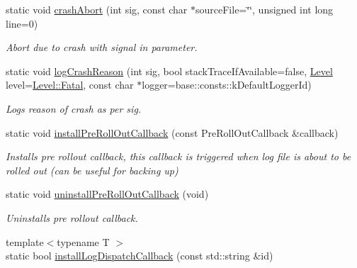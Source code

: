 \begin{DoxyCompactItemize}
static void \hyperlink{classel_1_1_helpers_a6e16f0e07ce40e0659fcfec4ea5b6fe1}{crash\+Abort} (int sig, const char $\ast$source\+File=\char`\"{}\char`\"{}, unsigned int long line=0)
\begin{DoxyCompactList}\small\item\em Abort due to crash with signal in parameter. \end{DoxyCompactList}\item 
static void \hyperlink{classel_1_1_helpers_abf1ae61428740e1e6c5d5f0c36500faa}{log\+Crash\+Reason} (int sig, bool stack\+Trace\+If\+Available=false, \hyperlink{namespaceel_ab0ac6091262344c52dd2d3ad099e8e36}{Level} level=\hyperlink{namespaceel_ab0ac6091262344c52dd2d3ad099e8e36a882384ec38ce8d9582b57e70861730e4}{Level\+::\+Fatal}, const char $\ast$logger=base\+::consts\+::k\+Default\+Logger\+Id)
\begin{DoxyCompactList}\small\item\em Logs reason of crash as per sig. \end{DoxyCompactList}\item 
\mbox{\label{classel_1_1_helpers_a5fd7ad6d636c28d2e706203d0c43cf8c}} 
static void \hyperlink{classel_1_1_helpers_a5fd7ad6d636c28d2e706203d0c43cf8c}{install\+Pre\+Roll\+Out\+Callback} (const Pre\+Roll\+Out\+Callback \&callback)
\begin{DoxyCompactList}\small\item\em Installs pre rollout callback, this callback is triggered when log file is about to be rolled out (can be useful for backing up) \end{DoxyCompactList}\item 
\mbox{\label{classel_1_1_helpers_ab829e5ed1b43bf965f5c288bc0280376}} 
static void \hyperlink{classel_1_1_helpers_ab829e5ed1b43bf965f5c288bc0280376}{uninstall\+Pre\+Roll\+Out\+Callback} (void)
\begin{DoxyCompactList}\small\item\em Uninstalls pre rollout callback. \end{DoxyCompactList}\item 
\mbox{\label{classel_1_1_helpers_a3f3e84057567a8ac568a35899318544a}} 
{\footnotesize template$<$typename T $>$ }\\static bool \hyperlink{classel_1_1_helpers_a3f3e84057567a8ac568a35899318544a}{install\+Log\+Dispatch\+Callback} (const std\+::string \&id)

\end{DoxyCompactItemize}
